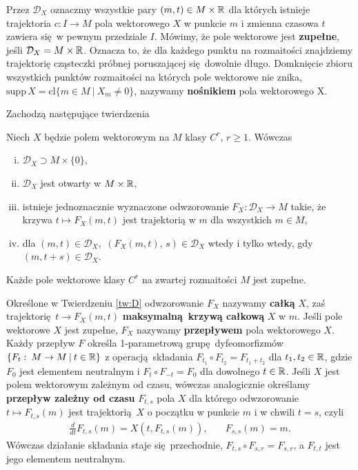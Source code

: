 Przez \(\mathcal{D}_X\) oznaczmy wszystkie pary \((m, t)\in M \times \mathbb{R}\) dla których istnieje trajektoria \(c: I\rightarrow M\) pola wektorowego \(X\) w punkcie \(m\) i zmienna czasowa \(t\) zawiera się w pewnym przedziale \(I\). Mówimy, że pole wektorowe jest \textbf{zupełne}, jeśli \(\mathcal{D}_X = M \times \mathbb{R}\). Oznacza to, że dla każdego punktu na rozmaitości znajdziemy trajektorię cząsteczki próbnej poruszającej się dowolnie długo. Domknięcie zbioru wszystkich punktów rozmaitości na których pole wektorowe nie znika, \(\mathrm{supp}\,X=\mathrm{cl}\{m\in M\:|\: X_m\neq 0\}\), nazywamy \textbf{nośnikiem} pola wektorowego X. 

Zachodzą następujące twierdzenia
\begin{twierdzenie}\label{tw:D}
Niech \(X\) będzie polem wektorowym na \(M\) klasy \(C^r,\, r\geq1\). Wówczas
\begin{enumerate}[i)]
\item \(\mathcal{D}_X\supset M\times \{0\}\),
\item \(\mathcal{D}_X\) jest otwarty w \(M\times \mathbb{R}\),
\item istnieje jednoznacznie wyznaczone odwzorowanie \(F_X:\mathcal{D}_X\rightarrow M\) takie, że krzywa \(t\mapsto F_X(m,t)\) jest trajektorią w \(m\) dla wszystkich \(m\in M\),
\item dla \((m,t)\in \mathcal{D}_X,\) \((F_X(m,t),\, s)\in\mathcal{D}_X\) wtedy i tylko wtedy, gdy \((m, t+s)\in \mathcal{D}_X\).
\end{enumerate}
\end{twierdzenie}  

\begin{twierdzenie}
Każde pole wektorowe klasy \(C^r\) na zwartej rozmaitości \(M\) jest zupełne.
\end{twierdzenie}

Określone w Twierdzeniu \ref{tw:D} odwzorowanie \(F_X\) nazywamy \textbf{całką} \(X\), zaś trajektorię \(t\rightarrow F_X(m,t)\) \textbf{maksymalną krzywą całkową} \(X\) w \(m\). Jeśli pole wektorowe \(X\) jest zupełne, \(F_X\) nazywamy \textbf{przepływem} pola wektorowego \(X\). Każdy przepływ \(F\) określa 1-parametrową grupę dyfeomorfizmów \(\{F_t:\:M\rightarrow M\:|\: t\in \mathbb{R}\}\) z operacją składania \(F_{t_1}\circ F_{t_2} = F_{t_1 + t_2}\) dla \(t_{1}, {t}_2 \in \mathbb{R}\), gdzie \(F_0\) jest elementem neutralnym i \(F_{t}\circ F_{-t} = F_{0}\) dla dowolnego \(t\in\mathbb{R}\). Jeśli \(X\) jest polem wektorowym zależnym od czasu, wówczas analogicznie określamy \textbf{przepływ zależny od czasu} \(F_{t,s}\) pola \(X\) dla którego odwzorowanie \(t\mapsto F_{t,s}(m)\) jest trajektorią \(X\) o początku w punkcie \(m\) i w chwili \(t=s\), czyli
\begin{align}
\frac{d}{dt}F_{t,s}(m) = X\left(t, F_{t,s}(m)\right), &\quad F_{s,s}(m) = m.
\end{align} 
Wówczas działanie składania staje się przechodnie, \(F_{t,s}\circ F_{s,r} = F_{s, r}\), a \(F_{t, t}\) jest jego elementem neutralnym. 

